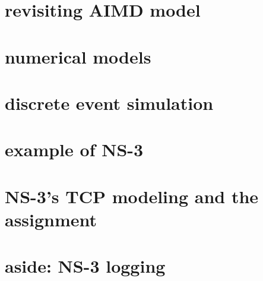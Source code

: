 




\section{revisiting AIMD model}




\section{numerical models}



\section{discrete event simulation}


\section{example of NS-3}


\section{NS-3's TCP modeling and the assignment}


\section{aside: NS-3 logging}

